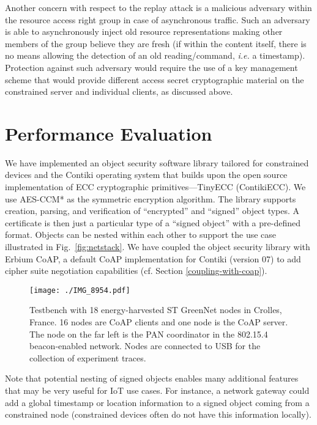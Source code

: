 \documentclass[conference]{IEEEtran}
\begin{document}
Another concern with respect to the replay attack is a malicious adversary
within the resource access right group in case of asynchronous traffic. Such an
adversary is able to asynchronously inject old resource representations making
other members of the group believe they are fresh (if within the content itself,
there is no means allowing the detection of an old reading/command, \emph{i.e.}
a timestamp). Protection against such adversary would require the use of a key
management scheme that would provide different access secret cryptographic
material on the constrained server and individual clients, as discussed above. 













 \section{Performance Evaluation}
\label{evaluation}
We have implemented an object security software library tailored for constrained
devices and the Contiki operating system that builds upon the open source
implementation of ECC cryptographic primitives---TinyECC (ContikiECC). We use
AES-CCM* as the symmetric encryption algorithm. The library supports creation,
parsing, and verification of ``encrypted'' and ``signed'' object
types. A certificate is then just a particular type of a ``signed object'' with a
pre-defined format.   Objects can be nested within each other to support 
the use
case illustrated in Fig.~\ref{fig:netstack}. We have coupled the
object security library with Erbium CoAP, a default CoAP implementation for
Contiki (version 07) to add cipher suite negotiation capabilities (cf. Section
\ref{coupling-with-coap}). 

\begin{figure}[htbp]
\centering
\texttt{[image: ./IMG\_8954.pdf]}
\caption{Testbench with 18 energy-harvested ST GreenNet nodes in Crolles,
  France. 16 nodes are CoAP clients and one node is the CoAP server. The node on
  the far left is the PAN coordinator in the 802.15.4 beacon-enabled
  network. Nodes are connected to USB for the collection of experiment traces.
}
\label{testbench}
\end{figure}
Note that potential nesting of signed objects enables many additional features
that may be very useful for IoT use cases. For instance, a network gateway could add a global timestamp or location information to a signed object coming from a constrained node (constrained devices often do not have this information locally). 
\end{document}
